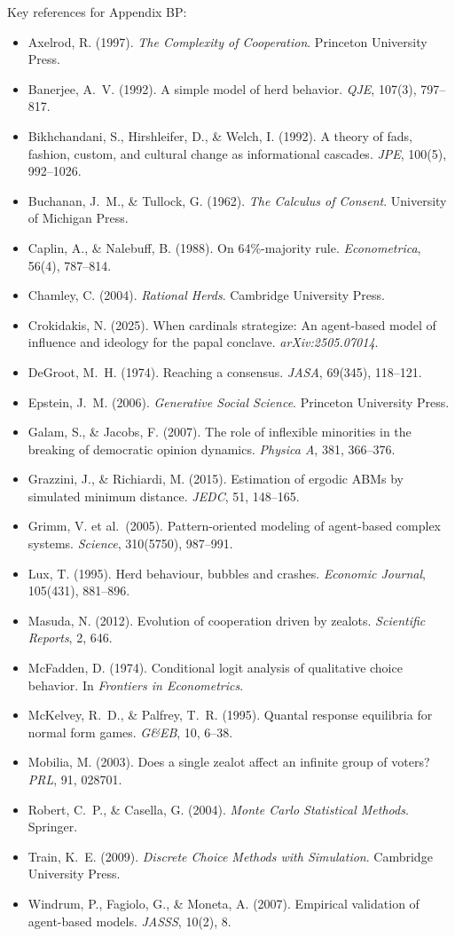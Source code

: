 \nocite{bcm_master}

Key references for Appendix BP:

\begin{itemize}[nosep, leftmargin=*]
\item Axelrod, R. (1997). \textit{The Complexity of Cooperation}. Princeton University Press.
\item Banerjee, A.~V. (1992). A simple model of herd behavior. \textit{QJE}, 107(3), 797--817.
\item Bikhchandani, S., Hirshleifer, D., \& Welch, I. (1992). A theory of fads, fashion, custom, and cultural change as informational cascades. \textit{JPE}, 100(5), 992--1026.
\item Buchanan, J.~M., \& Tullock, G. (1962). \textit{The Calculus of Consent}. University of Michigan Press.
\item Caplin, A., \& Nalebuff, B. (1988). On 64\%-majority rule. \textit{Econometrica}, 56(4), 787--814.
\item Chamley, C. (2004). \textit{Rational Herds}. Cambridge University Press.
\item Crokidakis, N. (2025). When cardinals strategize: An agent-based model of influence and ideology for the papal conclave. \textit{arXiv:2505.07014}.
\item DeGroot, M.~H. (1974). Reaching a consensus. \textit{JASA}, 69(345), 118--121.
\item Epstein, J.~M. (2006). \textit{Generative Social Science}. Princeton University Press.
\item Galam, S., \& Jacobs, F. (2007). The role of inflexible minorities in the breaking of democratic opinion dynamics. \textit{Physica A}, 381, 366--376.
\item Grazzini, J., \& Richiardi, M. (2015). Estimation of ergodic ABMs by simulated minimum distance. \textit{JEDC}, 51, 148--165.
\item Grimm, V. et al.\ (2005). Pattern-oriented modeling of agent-based complex systems. \textit{Science}, 310(5750), 987--991.
\item Lux, T. (1995). Herd behaviour, bubbles and crashes. \textit{Economic Journal}, 105(431), 881--896.
\item Masuda, N. (2012). Evolution of cooperation driven by zealots. \textit{Scientific Reports}, 2, 646.
\item McFadden, D. (1974). Conditional logit analysis of qualitative choice behavior. In \textit{Frontiers in Econometrics}.
\item McKelvey, R.~D., \& Palfrey, T.~R. (1995). Quantal response equilibria for normal form games. \textit{G\&EB}, 10, 6--38.
\item Mobilia, M. (2003). Does a single zealot affect an infinite group of voters? \textit{PRL}, 91, 028701.
\item Robert, C.~P., \& Casella, G. (2004). \textit{Monte Carlo Statistical Methods}. Springer.
\item Train, K.~E. (2009). \textit{Discrete Choice Methods with Simulation}. Cambridge University Press.
\item Windrum, P., Fagiolo, G., \& Moneta, A. (2007). Empirical validation of agent-based models. \textit{JASSS}, 10(2), 8.
\end{itemize}
